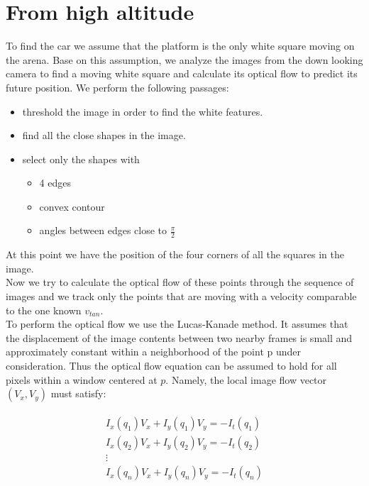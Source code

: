 \section{From high altitude}
To find the car we assume that the platform is the only white square moving on the arena.
Base on this assumption, we analyze the images from the down looking camera to find a moving white square and calculate its optical flow to predict its future position.
We perform the following passages:
\begin{itemize}
\item threshold the image in order to find the white features.
\item find all the close shapes in the image.
\item select only the shapes with
\begin{itemize}
\item 4 edges
\item convex contour
\item angles between edges close to $\frac{\pi}{2}$
\end{itemize}
\end{itemize}
At this point we have the position of the four corners of all the squares in the image.\\
Now we try to calculate the optical flow of these points through the sequence of images and we track only the points that are moving with a velocity comparable to the one known $v_{tan}$.\\
To perform the optical flow we use the Lucas-Kanade method. %
It assumes that the displacement of the image contents between two nearby frames is small and approximately constant within a neighborhood of the point p under consideration. Thus the optical flow equation can be assumed to hold for all pixels within a window centered at $p$. Namely, the local image flow vector $(V_{x},V_{y})$ must satisfy:

\begin{align}
\begin{split}
I_{x}(q_{1})V_{x}+I_{y}(q_{1})V_{y}=-I_{t}(q_{1})  \\
I_{x}(q_{2})V_{x}+I_{y}(q_{2})V_{y}=-I_{t}(q_{2})  \\
\vdots \\
I_{x}(q_{n})V_{x}+I_{y}(q_{n})V_{y}=-I_{t}(q_{n}) 
\end{split}
\end{align}

